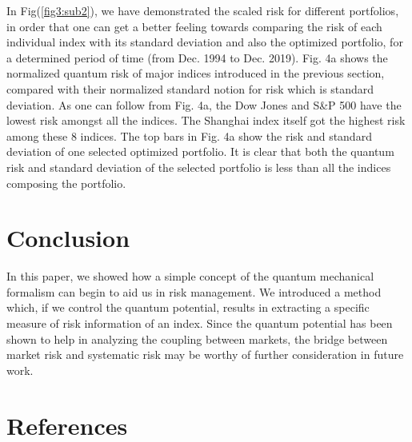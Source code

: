 \documentclass[ aip,jmp,reprint]{revtex4-2}
\begin{document}
In Fig(\ref{fig3:sub2}), we have demonstrated the scaled risk for different
portfolios, in order that one can get a better feeling towards comparing the
risk of each individual index with its standard deviation and also the
optimized portfolio, for a determined period of time (from Dec. 1994 to Dec.
2019). Fig. 4a shows the normalized quantum risk of major indices introduced
in the previous section, compared with their normalized standard notion for
risk which is standard deviation. As one can follow from Fig. 4a, the Dow
Jones and S\&P 500 have the lowest risk amongst all the indices. The
Shanghai index itself got the highest risk among these 8 indices. The top
bars in Fig. 4a show the risk and standard deviation of one selected
optimized portfolio. It is clear that both the quantum risk and standard
deviation of the selected portfolio is less than all the indices composing
the portfolio.

\newpage

\section{Conclusion}

In this paper, we showed how a simple concept of the quantum mechanical
formalism can begin to aid us in risk management. We introduced a method
which, if we control the quantum potential, results in extracting a specific
measure of risk information of an index. Since the quantum potential has
been shown to help in analyzing the coupling between markets, the bridge
between market risk and systematic risk may be worthy of further
consideration in future work.

\newpage

\section{References}
\end{document}
